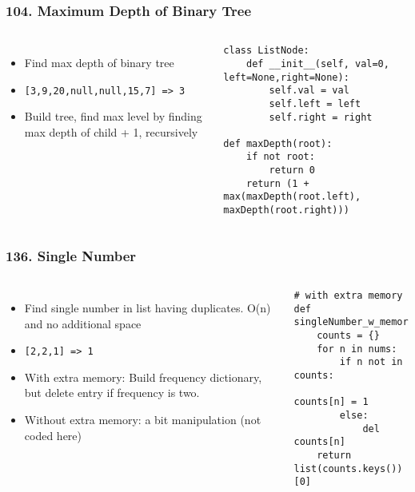 \begin{frame}[fragile]\frametitle{104. Maximum Depth of Binary Tree}

	\begin{columns}[T]
	\begin{itemize}
	\item Find max depth of binary tree
	\item \lstinline{[3,9,20,null,null,15,7] => 3}
	\item Build tree, find max level by finding max depth of child + 1, recursively
	\end{itemize}
		\begin{lstlisting}[basicstyle=\scriptsize]
class ListNode:
    def __init__(self, val=0, left=None,right=None):
        self.val = val
        self.left = left
        self.right = right

def maxDepth(root):
    if not root:
        return 0
    return (1 + max(maxDepth(root.left), maxDepth(root.right)))
				\end{lstlisting}		

	\end{columns}
		
\end{frame}

\begin{frame}[fragile]\frametitle{136. Single Number}

	\begin{columns}[T]
	\begin{itemize}
	\item Find single number in list having duplicates. O(n) and no additional space
	\item \lstinline{[2,2,1] => 1}
	\item With extra memory: Build frequency dictionary, but delete entry if frequency is two.
	\item Without extra memory: a bit manipulation (not coded here)
	\end{itemize}
		\begin{lstlisting}[basicstyle=\scriptsize]
# with extra memory
def singleNumber_w_memory(nums):
    counts = {}
    for n in nums:
        if n not in counts:
            counts[n] = 1
        else:
            del counts[n]
    return list(counts.keys())[0]
				\end{lstlisting}		

	\end{columns}
		
\end{frame}

